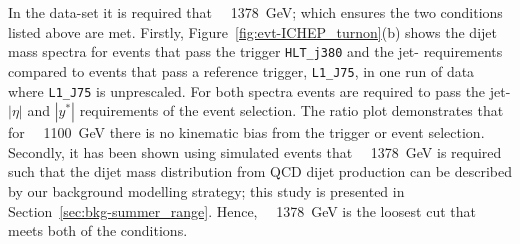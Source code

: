 In the \summer{} data-set it is required that \mjj~\gt~1378~GeV;
which ensures the two conditions listed above are met.
Firstly, Figure~\ref{fig:evt-ICHEP_turnon}(b) shows the dijet mass spectra for events
that pass the trigger \verb|HLT_j380| and the \summer{} jet-\pT{} requirements
compared to events that pass a reference trigger, \verb|L1_J75|,
in one run of data where \verb|L1_J75| is unprescaled.
For both spectra events are required to pass the jet-$|\eta|$ and $|y^*|$ requirements of the \summer{} event selection.
The ratio plot demonstrates that for \mjj~\gt~1100~GeV there is no kinematic bias from the trigger or event selection.
Secondly, it has been shown using simulated events that
\mjj~\gt~1378~GeV is required such that the dijet mass distribution from QCD dijet production
can be described by our background modelling strategy;
this study is presented in Section~\ref{sec:bkg-summer_range}.
Hence, \mjj~\gt~1378~GeV is the loosest cut that meets both of the conditions.



